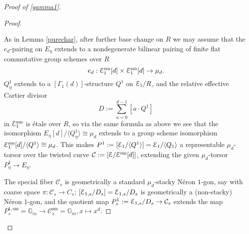 \documentclass[11pt]{amsart}
\theoremstyle{definition}
\begin{document}
\begin{proof}[Proof of \ref{gamma1}]
\begin{proof}
\begin{center}
\end{center}
As in Lemma \ref{purechar}, after further base change on $R$ we may assume that the $e_d$-pairing on $E_\eta$ extends to a nondegenerate bilinear pairing of finite flat commutative group schemes over $R$ 
\begin{displaymath}
e_d: {\mathbf{\EuScript{E}}}_1^{\mathrm{sm}}[d] \times {\mathbf{\EuScript{E}}}_1^{\mathrm{sm}}[d] \rightarrow \mu_d.
\end{displaymath}
$Q^1_\eta$ extends to a $[\Gamma_1(d)]$-structure $Q^1$ on ${\mathbf{\EuScript{E}}}_1/R$, and the relative effective Cartier divisor 
\begin{displaymath}
D:=\sum_{a = 0}^{d-1} [a\cdot Q^1]
\end{displaymath}
in ${\mathbf{\EuScript{E}}}_1^{\mathrm{sm}}$ is \'etale over $R$, so via the same formula as above we see that the isomorphism $E_\eta[d]/\langle Q^1_\eta \rangle \cong \mu_d$ extends to a group scheme isomorphism ${\mathbf{\EuScript{E}}}_1^{\mathrm{sm}}[d]/\langle Q^1 \rangle \cong \mu_d$. This makes $P^1 := [{\mathbf{\EuScript{E}}}_1/\langle Q^1 \rangle] = {\mathbf{\EuScript{E}}}_1/\langle Q_1 \rangle$ a representable $\mu_d$-torsor over the twisted curve ${\mathcal{C}} := [{\mathbf{\EuScript{E}}}/{\mathbf{\EuScript{E}}}^{\mathrm{sm}}[d]]$, extending the given $\mu_d$-torsor $P^1_\eta \rightarrow E_\eta$.

The special fiber ${\mathcal{C}}_s$ is geometrically a standard $\mu_d$-stacky N\'eron $1$-gon, say with coarse space $\pi: {\mathcal{C}}_s \rightarrow C_s$; $[{\mathbf{\EuScript{E}}}_{1,s}/D_s] = {\mathbf{\EuScript{E}}}_{1,s}/D_s$ is geometrically a (non-stacky) N\'eron $1$-gon, and the quotient map $P^1_s := {\mathbf{\EuScript{E}}}_{1,s}/D_s \rightarrow {\mathcal{C}}_s$ extends the map $P_s^{1,\mathrm{sm}} = \mathbb{G}_m \rightarrow {\mathcal{C}}_s^{\mathrm{sm}} = \mathbb{G}_m,x\mapsto x^d$. 


\end{proof}
\end{proof}
\end{document}
